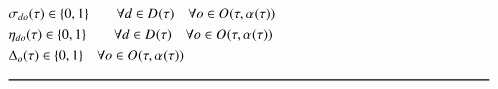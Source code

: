 \begin{alignat}{2}
	& \VarTacticalWorkBinary{\ElementDays}{\ElementOperation} \in \{0, 1\}\quad                                                                                                                                                                                         \quad \forall \ElementDays \in \SetDays{} \quad \forall \ElementOperation \in \SetOperation{}{\VarStrategicWorkOrderAssignment{}{}}                                                                                                                                                        \\
	& \VarTacticalWorkBinaryConsecutive \in \{0, 1\}\quad                                                                                                                                                                                                               \quad \forall \ElementDays \in \SetDays{} \quad \forall \ElementOperation \in \SetOperation{}{\VarStrategicWorkOrderAssignment{}{}}                                                                                                                                                        \\
	& \VarTacticalOperationDifference \in \{0, 1\}                                                                                                                                                                                                                              \quad \forall \ElementOperation \in \SetOperation{}{\VarStrategicWorkOrderAssignment{}{}}\\
	& \text{\rule{\linewidth}{0.8pt}} \notag \label{}                                                                                                                                                                                                                                                                                                                                                                     \\ 
\end{alignat}

